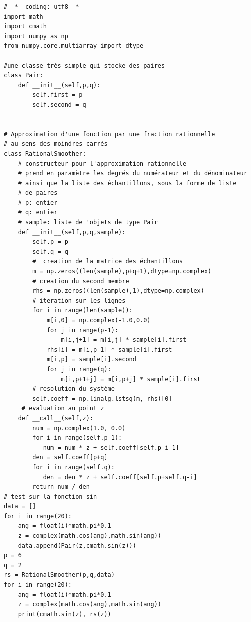\begin{verbatim}
# -*- coding: utf8 -*-
import math
import cmath
import numpy as np
from numpy.core.multiarray import dtype

#une classe très simple qui stocke des paires
class Pair:
    def __init__(self,p,q):
        self.first = p
        self.second = q


# Approximation d'une fonction par une fraction rationnelle
# au sens des moindres carrés 
class RationalSmoother:
    # constructeur pour l'approximation rationnelle
    # prend en paramètre les degrés du numérateur et du dénominateur
    # ainsi que la liste des échantillons, sous la forme de liste 
    # de paires
    # p: entier
    # q: entier
    # sample: liste de 'objets de type Pair
    def __init__(self,p,q,sample):
        self.p = p
        self.q = q
        #  creation de la matrice des échantillons
        m = np.zeros((len(sample),p+q+1),dtype=np.complex)
        # creation du second membre
        rhs = np.zeros((len(sample),1),dtype=np.complex)
        # iteration sur les lignes
        for i in range(len(sample)):
            m[i,0] = np.complex(-1.0,0.0)
            for j in range(p-1):
                m[i,j+1] = m[i,j] * sample[i].first
            rhs[i] = m[i,p-1] * sample[i].first
            m[i,p] = sample[i].second
            for j in range(q):
                m[i,p+1+j] = m[i,p+j] * sample[i].first
        # resolution du système
        self.coeff = np.linalg.lstsq(m, rhs)[0]
     # evaluation au point z
    def __call__(self,z):
        num = np.complex(1.0, 0.0)
        for i in range(self.p-1):
           num = num * z + self.coeff[self.p-i-1]
        den = self.coeff[p+q]
        for i in range(self.q):
           den = den * z + self.coeff[self.p+self.q-i]
        return num / den
# test sur la fonction sin
data = []
for i in range(20):
    ang = float(i)*math.pi*0.1
    z = complex(math.cos(ang),math.sin(ang))
    data.append(Pair(z,cmath.sin(z)))
p = 6
q = 2
rs = RationalSmoother(p,q,data)
for i in range(20):
    ang = float(i)*math.pi*0.1
    z = complex(math.cos(ang),math.sin(ang))
    print(cmath.sin(z), rs(z))
\end{verbatim}
\newpage
{}
\vskip 12pt
